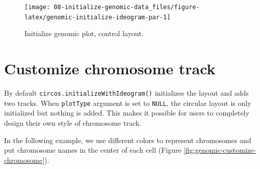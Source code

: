 \documentclass[]{book}
\newenvironment{Shaded}{\begin{snugshade}}{\end{snugshade}}
\newcommand{\KeywordTok}[1]{\textcolor[rgb]{0.13,0.29,0.53}{\textbf{#1}}}
\newcommand{\DataTypeTok}[1]{\textcolor[rgb]{0.13,0.29,0.53}{#1}}
\newcommand{\DecValTok}[1]{\textcolor[rgb]{0.00,0.00,0.81}{#1}}
\newcommand{\FloatTok}[1]{\textcolor[rgb]{0.00,0.00,0.81}{#1}}
\newcommand{\StringTok}[1]{\textcolor[rgb]{0.31,0.60,0.02}{#1}}
\newcommand{\OtherTok}[1]{\textcolor[rgb]{0.56,0.35,0.01}{#1}}
\newcommand{\ControlFlowTok}[1]{\textcolor[rgb]{0.13,0.29,0.53}{\textbf{#1}}}
\newcommand{\OperatorTok}[1]{\textcolor[rgb]{0.81,0.36,0.00}{\textbf{#1}}}
\newcommand{\NormalTok}[1]{#1}
\begin{document}
\begin{figure}

{\centering \texttt{[image: 08-initialize-genomic-data\_files/figure-latex/genomic-initialize-ideogram-par-1]} 

}

\caption{Initialize genomic plot, control layout.}\label{fig:genomic-initialize-ideogram-par}
\end{figure}

\section{Customize chromosome track}\label{customize-chromosome-track}

By default \texttt{circos.initializeWithIdeogram()} initializes the
layout and adds two tracks. When \texttt{plotType} argument is set to
\texttt{NULL}, the circular layout is only initialized but nothing is
added. This makes it possible for users to completely design their own
style of chromosome track.

In the following example, we use different colors to represent
chromosomes and put chromosome names in the center of each cell (Figure
\ref{fig:genomic-customize-chromosome}).

\begin{Shaded}
\end{Shaded}
\end{document}
